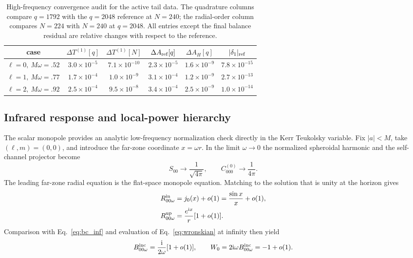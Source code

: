 \documentclass[aps,prd,twocolumn,10pt,nofootinbib,superscriptaddress,floatfix]{revtex4-2}
\newcommand{\ii}{\mathrm{i}}
\begin{document}
\begin{table}[t]
\caption{High-frequency convergence audit for the active tail data.  The
quadrature columns compare $q=1792$ with the $q=2048$ reference at $N=240$;
the radial-order column compares $N=224$ with $N=240$ at $q=2048$.  All
entries except the final balance residual are relative changes with respect to
the reference.}
\label{tab:tail-convergence}
\begin{ruledtabular}
\begin{tabular}{c c c c c c}
case & $\Delta T^{(1)}[q]$ & $\Delta T^{(1)}[N]$
& $\Delta A_{\rm ref}[q]$ & $\Delta A_H[q]$ & $|\delta_1|_{\rm ref}$\\
\hline
$\ell=0,\ M\omega=.52$ & $3.0\times10^{-5}$ & $7.1\times10^{-10}$ & $2.3\times10^{-5}$ & $1.6\times10^{-9}$ & $7.8\times10^{-15}$\\
$\ell=1,\ M\omega=.77$ & $1.7\times10^{-4}$ & $1.0\times10^{-9}$ & $3.1\times10^{-4}$ & $1.2\times10^{-9}$ & $2.7\times10^{-13}$\\
$\ell=2,\ M\omega=.92$ & $2.5\times10^{-4}$ & $9.5\times10^{-8}$ & $3.4\times10^{-4}$ & $2.5\times10^{-9}$ & $1.0\times10^{-14}$\\
\end{tabular}
\end{ruledtabular}
\end{table}

\subsection{Infrared response and local-power hierarchy}

The scalar monopole provides an analytic low-frequency normalization check
directly in the Kerr Teukolsky variable.  Fix $|a|<M$, take
$(\ell,m)=(0,0)$, and introduce the far-zone coordinate $x=\omega r$.
In the limit $\omega\to0$ the normalized spheroidal harmonic and the
self-channel projector become
\begin{equation}
 S_{00}\longrightarrow\frac{1}{\sqrt{4\pi}},\qquad
 C^{(0)}_{000}\longrightarrow\frac{1}{4\pi}.
 \label{eq:l0-angular-limit}
\end{equation}
The leading far-zone radial equation is the flat-space monopole equation.
Matching to the solution that is unity at the horizon gives
\begin{align}
 R^{\rm in}_{00\omega}
 &=j_0(x)+o(1)=\frac{\sin x}{x}+o(1),\nonumber\\
 R^{\rm up}_{00\omega}
 &=\frac{e^{\ii x}}{r}[1+o(1)].
 \label{eq:l0-far-solutions}
\end{align}
Comparison with Eq.~\eqref{eq:bc_inf} and evaluation of
Eq.~\eqref{eq:wronskian} at infinity then yield
\begin{equation}
 B^{\rm inc}_{00\omega}=\frac{\ii}{2\omega}[1+o(1)],
 \qquad
 W_0=2\ii\omega B^{\rm inc}_{00\omega}=-1+o(1).
 \label{eq:l0-binc-wronskian}
\end{equation}
\end{document}
